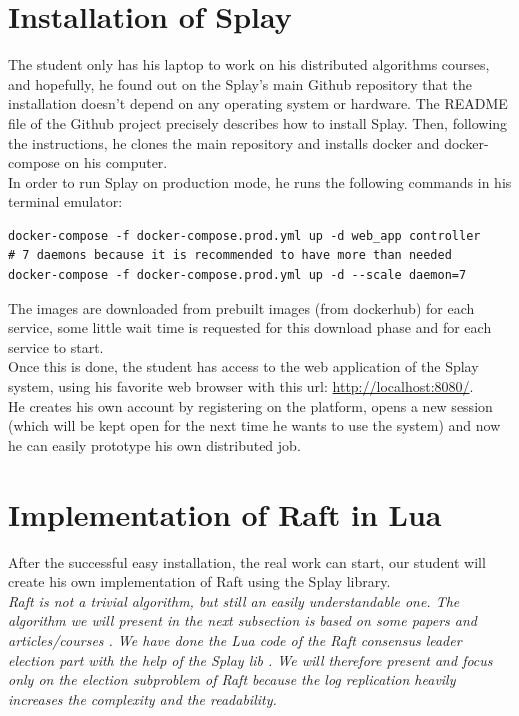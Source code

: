\documentclass{eplmastersthesis}
\begin{document}
    \section{Installation of Splay}

      The student only has his laptop to work on his distributed algorithms
      courses, and hopefully, he found out on the Splay's main Github
      repository \cite{SplayV2Git} that the installation doesn't depend on
      any operating system or hardware. The README file of the Github project
      precisely describes how to install Splay. Then, following the
      instructions, he clones the main repository and installs docker and
      docker-compose on his computer.\\
      In order to run Splay on production mode, he runs the following
      commands in his terminal emulator: \\

      \begin{lstlisting}[style=MyBash]
docker-compose -f docker-compose.prod.yml up -d web_app controller
# 7 daemons because it is recommended to have more than needed
docker-compose -f docker-compose.prod.yml up -d --scale daemon=7
      \end{lstlisting}

      The images are downloaded from prebuilt images (from dockerhub) for
      each service, some little wait time is requested for this download
      phase and for each service to start.\\
      Once this is done, the student has access to the web application of
      the Splay system, using his favorite web browser with this url:
      \url{http://localhost:8080/}.\\
      He creates his own account by registering on the platform, opens a new
      session (which will be kept open for the next time he wants to use
      the system) and now he can easily prototype his own distributed job.

    \section{Implementation of Raft in Lua}

      After the successful easy installation, the real work can start, our
      student will create his own implementation of Raft using the Splay
      library.\\

      \textit{Raft is not a trivial algorithm, but still an easily understandable
      one. The algorithm we will present in the next subsection is based on
      some papers \cite{RaftPaper} and articles/courses \cite{RaftSlide}
      \cite{RaftSite}. We have done the Lua code of the Raft consensus leader
      election part with the help of the Splay lib \cite{SplayLib}.
      We will therefore present and focus only on the election subproblem of
      Raft because the log replication heavily increases the complexity and
      the readability.}
\end{document}
